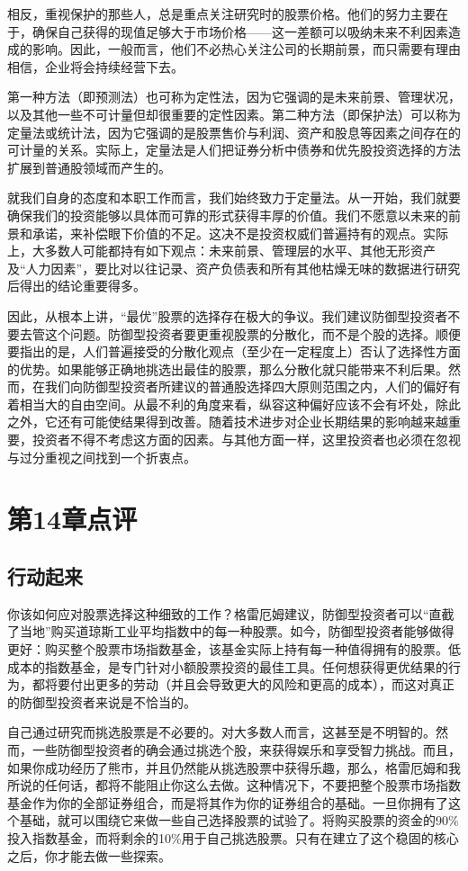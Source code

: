 \documentclass[12pt,oneside]{book}
\begin{document}
相反，重视保护的那些人，总是重点关注研究时的股票价格。他们的努力主要在于，确保自己获得的现值足够大于市场价格——这一差额可以吸纳未来不利因素造成的影响。因此，一般而言，他们不必热心关注公司的长期前景，而只需要有理由相信，企业将会持续经营下去。

第一种方法（即预测法）也可称为定性法，因为它强调的是未来前景、管理状况，以及其他一些不可计量但却很重要的定性因素。第二种方法（即保护法）可以称为定量法或统计法，因为它强调的是股票售价与利润、资产和股息等因素之间存在的可计量的关系。实际上，定量法是人们把证券分析中债券和优先股投资选择的方法扩展到普通股领域而产生的。

就我们自身的态度和本职工作而言，我们始终致力于定量法。从一开始，我们就要确保我们的投资能够以具体而可靠的形式获得丰厚的价值。我们不愿意以未来的前景和承诺，来补偿眼下价值的不足。这决不是投资权威们普遍持有的观点。实际上，大多数人可能都持有如下观点：未来前景、管理层的水平、其他无形资产及“人力因素”，要比对以往记录、资产负债表和所有其他枯燥无味的数据进行研究后得出的结论重要得多。

因此，从根本上讲，“最优”股票的选择存在极大的争议。我们建议防御型投资者不要去管这个问题。防御型投资者要更重视股票的分散化，而不是个股的选择。顺便要指出的是，人们普遍接受的分散化观点（至少在一定程度上）否认了选择性方面的优势。如果能够正确地挑选出最佳的股票，那么分散化就只能带来不利后果。然而，在我们向防御型投资者所建议的普通股选择四大原则范围之内，人们的偏好有着相当大的自由空间。从最不利的角度来看，纵容这种偏好应该不会有坏处，除此之外，它还有可能使结果得到改善。随着技术进步对企业长期结果的影响越来越重要，投资者不得不考虑这方面的因素。与其他方面一样，这里投资者也必须在忽视与过分重视之间找到一个折衷点。




\section{第14章点评}
\subsection{行动起来}
你该如何应对股票选择这种细致的工作？格雷厄姆建议，防御型投资者可以“直截了当地”购买道琼斯工业平均指数中的每一种股票。如今，防御型投资者能够做得更好：购买整个股票市场指数基金，该基金实际上持有每一种值得拥有的股票。低成本的指数基金，是专门针对小额股票投资的最佳工具。任何想获得更优结果的行为，都将要付出更多的劳动（并且会导致更大的风险和更高的成本），而这对真正的防御型投资者来说是不恰当的。

自己通过研究而挑选股票是不必要的。对大多数人而言，这甚至是不明智的。然而，一些防御型投资者的确会通过挑选个股，来获得娱乐和享受智力挑战。而且，如果你成功经历了熊市，并且仍然能从挑选股票中获得乐趣，那么，格雷厄姆和我所说的任何话，都将不能阻止你这么去做。这种情况下，不要把整个股票市场指数基金作为你的全部证券组合，而是将其作为你的证券组合的基础。一旦你拥有了这个基础，就可以围绕它来做一些自己选择股票的试验了。将购买股票的资金的90\%投入指数基金，而将剩余的10\%用于自己挑选股票。只有在建立了这个稳固的核心之后，你才能去做一些探索。
\end{document}
